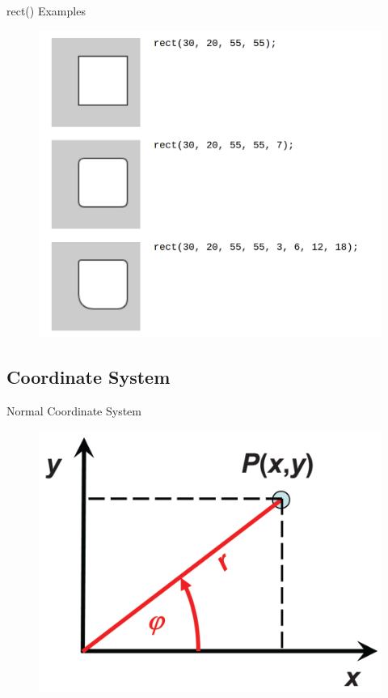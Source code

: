 \begin{frame}[fragile]{rect() Examples}{}
\begin{figure}
    \begin{center}
        \includegraphics[width=.7\linewidth]{images/rect.png}
    \end{center}
\end{figure}
\end{frame}

\subsection{Coordinate System}
\begin{frame}[fragile]{Normal Coordinate System}{}
\begin{figure}
    \begin{center}
        \includegraphics[width=.8\linewidth]{images/normal_coord.png}
    \end{center}
\end{figure}
\end{frame}

